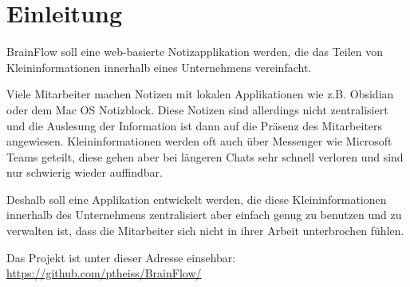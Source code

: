 \section{Einleitung}
BrainFlow soll eine web-basierte Notizapplikation werden, die das Teilen von Kleininformationen innerhalb eines Unternehmens vereinfacht.

\bigskip\noindent
Viele Mitarbeiter machen Notizen mit lokalen Applikationen wie z.B. Obsidian oder dem Mac OS Notizblock.
Diese Notizen sind allerdings nicht zentralisiert und die Auslesung der Information ist dann auf die Präsenz des Mitarbeiters angewiesen.
Kleininformationen werden oft auch über Messenger wie Microsoft Teams geteilt, diese gehen aber bei längeren Chats sehr schnell verloren
und sind nur schwierig wieder auffindbar.

\bigskip\noindent
Deshalb soll eine Applikation entwickelt werden, die diese Kleininformationen innerhalb des Unternehmens zentralisiert aber einfach genug
zu benutzen und zu verwalten ist, dass die Mitarbeiter sich nicht in ihrer Arbeit unterbrochen fühlen.

\bigskip\noindent
Das Projekt ist unter dieser Adresse einsehbar: \href{https://github.com/ptheiss/BrainFlow/}{https://github.com/ptheiss/BrainFlow/}